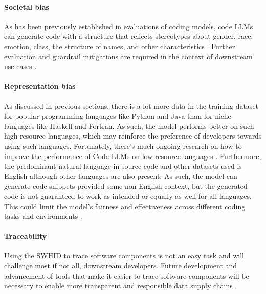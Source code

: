 \documentclass[10pt]{article} %
\begin{document}
\paragraph{Societal bias} As has been previously established in evaluations of coding models, code LLMs can generate code with a structure that reflects stereotypes about gender, race, emotion, class, the structure of names, and other characteristics \citep{chen2021evaluating,zhuo2023red}. Further evaluation and guardrail mitigations are required in the context of downstream use cases \citep{huang2024bias, dong2024guardrails}.

\paragraph{Representation bias} As discussed in previous sections, there is a lot more data in the training dataset for popular programming languages like Python and Java than for niche languages like Haskell and Fortran. As such, the model performs better on such high-resource languages, which may reinforce the preference of developers towards using such languages. Fortunately, there’s much ongoing research on how to improve the performance of Code LLMs on low-resource languages \citep{cassano2023knowledge,zhuo2023data}. Furthermore, the predominant natural language in source code and other datasets used is English although other languages are also present. As such, the model can generate code snippets provided some non-English context, but the generated code is not guaranteed to work as intended or equally as well for all languages. This could limit the model's fairness and effectiveness across different coding tasks and environments \citep{alyafeai2024cidar}. 

\paragraph{Traceability} Using the SWHID to trace software components is not an easy task and will challenge most if not all, downstream developers. Future development and advancement of tools that make it easier to trace software components will be necessary to enable more transparent and responsible data supply chains \citep{cosmo2020referencing}.
\end{document}
